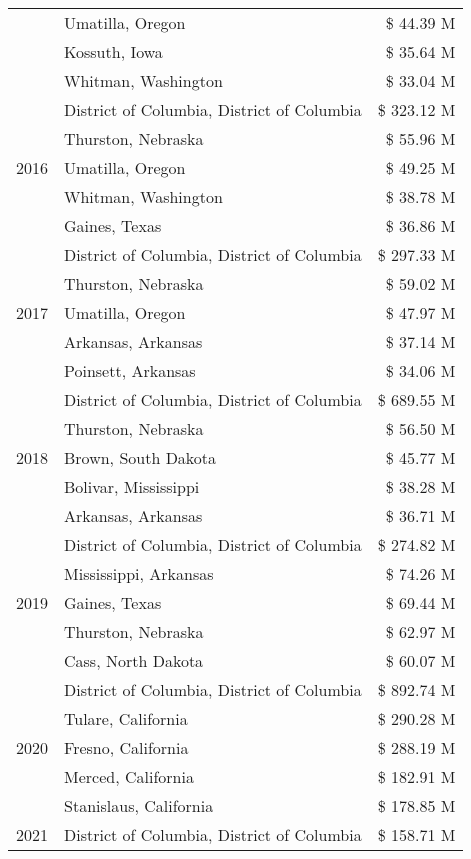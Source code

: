 \begin{tabular}{llr}
 & Umatilla, Oregon & \$ 44.39 M \\
 & Kossuth, Iowa & \$ 35.64 M \\
 & Whitman, Washington & \$ 33.04 M \\
\cline{1-3}
\multirow[t]{5}{*}{2016} & District of Columbia, District of Columbia & \$ 323.12 M \\
 & Thurston, Nebraska & \$ 55.96 M \\
 & Umatilla, Oregon & \$ 49.25 M \\
 & Whitman, Washington & \$ 38.78 M \\
 & Gaines, Texas & \$ 36.86 M \\
\cline{1-3}
\multirow[t]{5}{*}{2017} & District of Columbia, District of Columbia & \$ 297.33 M \\
 & Thurston, Nebraska & \$ 59.02 M \\
 & Umatilla, Oregon & \$ 47.97 M \\
 & Arkansas, Arkansas & \$ 37.14 M \\
 & Poinsett, Arkansas & \$ 34.06 M \\
\cline{1-3}
\multirow[t]{5}{*}{2018} & District of Columbia, District of Columbia & \$ 689.55 M \\
 & Thurston, Nebraska & \$ 56.50 M \\
 & Brown, South Dakota & \$ 45.77 M \\
 & Bolivar, Mississippi & \$ 38.28 M \\
 & Arkansas, Arkansas & \$ 36.71 M \\
\cline{1-3}
\multirow[t]{5}{*}{2019} & District of Columbia, District of Columbia & \$ 274.82 M \\
 & Mississippi, Arkansas & \$ 74.26 M \\
 & Gaines, Texas & \$ 69.44 M \\
 & Thurston, Nebraska & \$ 62.97 M \\
 & Cass, North Dakota & \$ 60.07 M \\
\cline{1-3}
\multirow[t]{5}{*}{2020} & District of Columbia, District of Columbia & \$ 892.74 M \\
 & Tulare, California & \$ 290.28 M \\
 & Fresno, California & \$ 288.19 M \\
 & Merced, California & \$ 182.91 M \\
 & Stanislaus, California & \$ 178.85 M \\
\cline{1-3}
\multirow[t]{5}{*}{2021} & District of Columbia, District of Columbia & \$ 158.71 M \\

\end{tabular}
